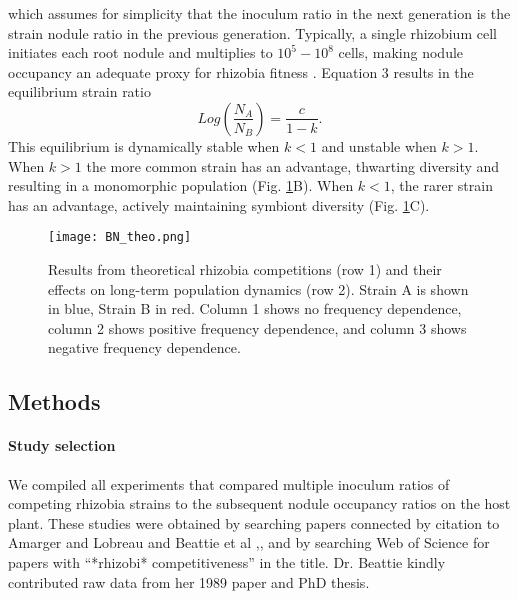 \documentclass[12pt]{article}
\begin{document}
\begin{doublespace}
which assumes for simplicity that the inoculum ratio in the next generation is the strain nodule ratio in the previous generation. Typically, a single rhizobium cell initiates each root nodule and multiplies to $10^5-10^8$ cells, making nodule occupancy an adequate proxy for rhizobia fitness \cite{Denison2000}. Equation 3 results in the equilibrium strain ratio 
\begin{equation}
Log\left(\frac{N_A}{N_B}\right) = \frac{c}{1 - k}.\tag{4}
\end{equation} 
This equilibrium is dynamically stable when $k < 1$ and unstable when $k > 1$.  When $k > 1$ the more common strain has an advantage, thwarting diversity and resulting in a monomorphic population (Fig. \ref{fig:theo}B). When $k < 1$, the rarer strain has an advantage, actively maintaining symbiont diversity (Fig. \ref{fig:theo}C). 

\begin{figure}[H] 
	\texttt{[image: BN\_theo.png]}
	\caption{Results from theoretical rhizobia competitions (row 1) and their effects on long-term population dynamics (row 2). Strain A is shown in blue, Strain B in red. Column 1 shows no frequency dependence, column 2 shows positive frequency dependence, and column 3 shows negative frequency dependence.
	}
	\label{fig:theo}
\end{figure}
\subsection{Methods}
\paragraph{Study selection}                  
We compiled all experiments that compared multiple inoculum ratios of competing rhizobia strains to the subsequent nodule occupancy ratios on the host plant. These studies were obtained by searching papers connected by citation to Amarger and Lobreau and Beattie et al \cite{Amarger1981},\cite{Beattie1989}, and by searching Web of Science for papers with ``*rhizobi* competitiveness'' in the title. Dr. Beattie kindly contributed raw data from her 1989 paper and PhD thesis.

\end{doublespace}
\end{document}
